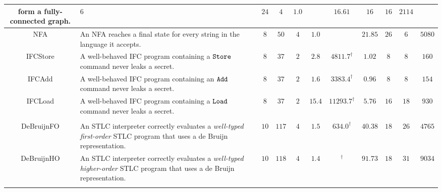 \begin{table}[t!]
\begin{tabular}{c|P{5.0cm}||ccc||cc||c|ccc}
{  form a fully-connected graph.} & $6$ & $24$ & $4$ & $1.0$ & \timeout{} & $16.61$ & $16$ & $16$ & $2114$\\
\midrule
\textsf{NFA}\cite{ZYDJ24} & {\scriptsize An NFA reaches a final state for every string in the language it accepts.} & $8$ & $50$ & $4$ & $1.0$ & \timeout{} & $21.85$ & $26$ & $6$ & $5080$\\
\midrule
\textsf{IFCStore}\cite{pbt-ifc} & {\scriptsize A well-behaved IFC program containing a ${\tt Store}$ command never leaks a secret.} & $8$ & $37$ & $2$ & $2.8$ & $4811.7^{\dagger}$ & $1.02$ & $8$ & $8$ & $160$\\
\midrule
\textsf{IFCAdd}\cite{pbt-ifc} & {\scriptsize A well-behaved IFC program containing an ${\tt Add}$ command never leaks a secret.} & $8$ & $37$ & $2$ & $1.6$ & $3383.4^{\dagger}$ & $0.96$ & $8$ & $8$ & $154$\\
\midrule
\textsf{IFCLoad}\cite{pbt-ifc} & {\scriptsize A well-behaved IFC program containing a ${\tt Load}$ command never leaks a secret.} & $8$ & $37$ & $2$ & $15.4$ & $11293.7^{\dagger}$ & $5.76$ & $16$ & $18$ & $930$\\
\midrule
{} &  &  &  &  &  &  &  &  &  & \\
\midrule
\textsf{DeBruijnFO}\cite{CoverageType} & {\scriptsize An STLC interpreter correctly evaluates a
\emph{well-typed first-order} STLC program that uses a de Bruijn representation.} & $10$ & $117$ & $4$ & $1.5$ & $634.0^{\dagger}$ & $40.38$ & $18$ & $26$ & $4765$\\
\midrule
\textsf{DeBruijnHO}\cite{CoverageType} & {\scriptsize An STLC interpreter correctly evaluates a
\emph{well-typed higher-order} STLC program that uses a de Bruijn representation.} & $10$ & $118$ & $4$ & $1.4$ & \timeout{}$^{\dagger}$ & $91.73$ & $18$ & $31$ & $9034$\\
\midrule
{} &  &  &  &  & \cbnewadding{\timeout{}} & \cbnewadding{\timeout{}$^{\dagger}$} &  &  &  & \\

\end{tabular}
\end{table}
